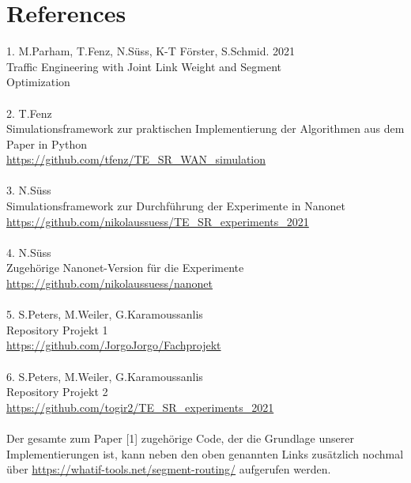 \documentclass[sigconf,noacm,review]{acmart}
\begin{document}
\section{References}
1. M.Parham, T.Fenz, N.Süss, K-T Förster, S.Schmid. 2021 \\
Traffic Engineering with Joint Link Weight and Segment \\
Optimization \\
\\
2. T.Fenz \\
Simulationsframework zur praktischen Implementierung der Algorithmen aus dem Paper in Python \\
\url{https://github.com/tfenz/TE_SR_WAN_simulation} \\
\\
3. N.Süss \\
Simulationsframework zur Durchführung der Experimente in Nanonet \\
\url{https://github.com/nikolaussuess/TE_SR_experiments_2021} \\
\\
4. N.Süss \\
Zugehörige Nanonet-Version für die Experimente \\
\url{https://github.com/nikolaussuess/nanonet} \\
\\
5. S.Peters, M.Weiler, G.Karamoussanlis \\
Repository Projekt 1 \\
\url{https://github.com/JorgoJorgo/Fachprojekt} \\
\\
6. S.Peters, M.Weiler, G.Karamoussanlis \\
Repository Projekt 2 \\
\url{https://github.com/togir2/TE_SR_experiments_2021} \\
\\
Der gesamte zum Paper [1] zugehörige Code, der die Grundlage unserer Implementierungen ist, kann neben den oben genannten Links zusätzlich nochmal über \url{https://whatif-tools.net/segment-routing/} aufgerufen werden. \\










\appendix

\end{document}
